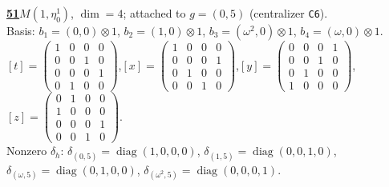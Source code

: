 \begin{samepage}\noindent\textbf{\underline{51}}\quad $M(1,\eta^{1}_{0})$, $\dim=4$; attached to $g=(0,5)$ (centralizer \texttt{C6}).\\
Basis: $b_{1}=(0,0)\otimes 1$, $b_{2}=(1,0)\otimes 1$, $b_{3}=(\omega^2,0)\otimes 1$, $b_{4}=(\omega,0)\otimes 1$.\\
$[t]=\left(\begin{smallmatrix} 1 & 0 & 0 & 0 \\ 0 & 0 & 1 & 0 \\ 0 & 0 & 0 & 1 \\ 0 & 1 & 0 & 0 \end{smallmatrix}\right)$,\quad $[x]=\left(\begin{smallmatrix} 1 & 0 & 0 & 0 \\ 0 & 0 & 0 & 1 \\ 0 & 1 & 0 & 0 \\ 0 & 0 & 1 & 0 \end{smallmatrix}\right)$,\quad $[y]=\left(\begin{smallmatrix} 0 & 0 & 0 & 1 \\ 0 & 0 & 1 & 0 \\ 0 & 1 & 0 & 0 \\ 1 & 0 & 0 & 0 \end{smallmatrix}\right)$,\quad $[z]=\left(\begin{smallmatrix} 0 & 1 & 0 & 0 \\ 1 & 0 & 0 & 0 \\ 0 & 0 & 0 & 1 \\ 0 & 0 & 1 & 0 \end{smallmatrix}\right)$.\\
Nonzero $\delta_h$: $\delta_{(0,5)}=\operatorname{diag}(1,0,0,0)$, $\delta_{(1,5)}=\operatorname{diag}(0,0,1,0)$, $\delta_{(\omega,5)}=\operatorname{diag}(0,1,0,0)$, $\delta_{(\omega^2,5)}=\operatorname{diag}(0,0,0,1)$.\end{samepage}
\medskip

